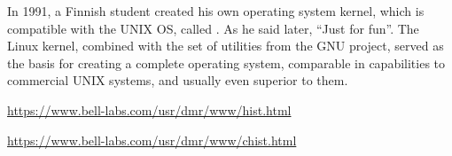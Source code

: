 In 1991, a Finnish student  created his own operating
system kernel, which is compatible with the UNIX OS, called .
As he said later, ``Just for fun''. The Linux kernel, combined with the set of
utilities from the GNU project, served as the basis for creating a complete
operating system, comparable in capabilities to commercial UNIX systems,
and usually even superior to them.

\medskip
\href{https://www.bell-labs.com/usr/dmr/www/hist.html}%
{\url{https://www.bell-labs.com/usr/dmr/www/hist.html}}

\noindent
\href{https://www.bell-labs.com/usr/dmr/www/chist.html}%
{\url{https://www.bell-labs.com/usr/dmr/www/chist.html}}
